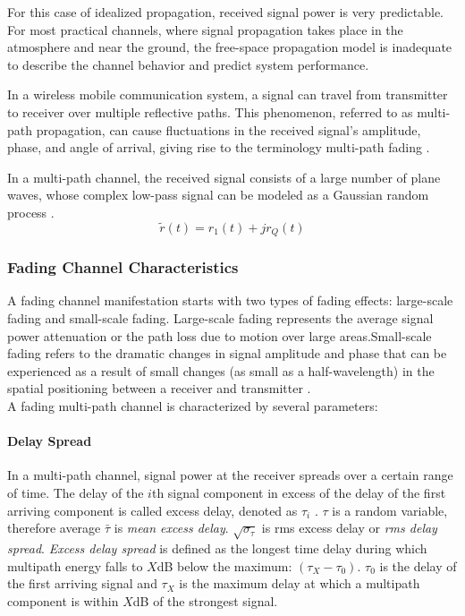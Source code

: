 For this case of idealized propagation, received signal power is very predictable. For most practical channels, where signal propagation takes place in the atmosphere and near the ground, the free-space propagation model is inadequate to describe the channel behavior and predict system performance.
 
In a wireless mobile communication system, a signal can travel from transmitter to receiver over multiple reflective paths. This phenomenon, referred to as multi-path propagation, can cause fluctuations in the received
signal’s amplitude, phase, and angle of arrival, giving rise to the terminology multi-path fading \cite{AWGN}.
  
In a multi-path channel, the received signal consists of a large number of plane waves, whose complex low-pass signal can be modeled as a Gaussian random process \cite{fuqin}.
$$ \tilde{r}(t)=r_{1}(t)+jr_{Q}(t) $$
\subsubsection{Fading Channel Characteristics} 
A fading channel manifestation starts with two types of fading effects: large-scale fading and small-scale fading. Large-scale fading represents the average signal power attenuation or the path loss due to motion over large areas.Small-scale fading refers to the dramatic changes in signal amplitude and phase that can be experienced as a result of small changes (as small as a half-wavelength) in the spatial positioning between a receiver and transmitter \cite{AWGN}.
\\A fading multi-path channel is characterized by several parameters: 

\paragraph{Delay Spread}
In a multi-path channel, signal power at the receiver spreads over a certain range of time. The delay of the $i$th signal component in excess of the delay of the first arriving component is called excess delay, denoted as $\tau_i$ \cite{fuqin}. $\tau$ is a random variable, therefore average $\bar{\tau}$ is \textit{mean excess delay}. $\sqrt{\sigma_\tau}$ is rms excess delay or \textit{rms delay spread}.
\textit{Excess delay spread} is defined as the longest time delay during which multipath energy falls to $X$dB below the maximum: $\left( \tau_X-\tau_0\right)$. $\tau_0$ is the delay of the first arriving signal and $\tau_X$ is the maximum delay at which a multipath component is within $X$dB of the strongest signal.

